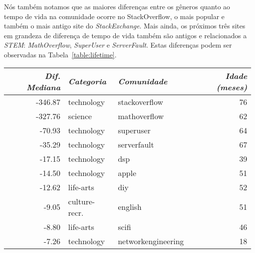 
Nós também notamos que as maiores diferenças entre os gêneros quanto ao tempo de vida na comunidade ocorre no StackOverflow, o mais popular e também o mais antigo site do \emph{StackExchange}. Mais ainda, os próximos três sites em grandeza de diferença de tempo de vida também são antigos e relacionados a \emph{STEM}: \emph{MathOverflow}, \emph{SuperUser} e \emph{ServerFault}. Estas diferenças podem ser observadas na Tabela~\ref{table:lifetime}. 

\begin{table}[Htbp]
\centering
\begin{tabular}{@{}rllr@{}}
\toprule
{\small\textit{Dif. Mediana}} & {\small \textit{Categoria}} & {\small \textit{Comunidade}} & {\small \textit{Idade (meses) }} \\ \midrule
-346.87                            & technology         & stackoverflow      & 76                 \\ \midrule
-327.76                           & science            & mathoverflow       & 62                 \\ \midrule
-70.93                            & technology         & superuser          & 64                 \\ \midrule
-35.29                            & technology         & serverfault        & 67                 \\ \midrule
-17.15                            & technology         & dsp                & 39                 \\ \midrule
-14.50                            & technology         & apple              & 51                 \\ \midrule
-12.62                            & life-arts          & diy                & 52                 \\ \midrule
-9.05                             & culture-recr. & english            & 51                 \\ \midrule
-8.80                             & life-arts          & scifi              & 46                 \\ \midrule
-7.26                             & technology         & networkengineering & 18                 \\ \midrule

\end{tabular}
\end{table}

